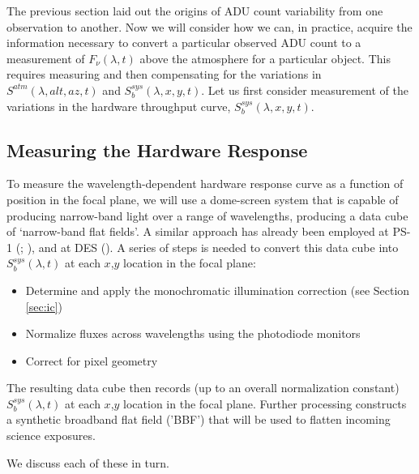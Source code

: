 \documentclass[12pt,preprint]{aastex}
\begin{document}
The previous section laid out the origins of ADU count variability
from one observation to another. Now we will consider how we can, in
practice, acquire the information necessary to convert a particular
observed ADU count to a measurement of $F_\nu(\lambda,t)$ above the
atmosphere for a particular object.  This requires measuring and then 
compensating for the variations in
$S^{atm}(\lambda,alt,az,t)$ and $S_b^{sys}(\lambda,x,y,t)$.
Let us first consider measurement of the variations in the hardware
throughput curve, $S_b^{sys}(\lambda,x,y,t)$. 



\subsection{Measuring the Hardware Response}
To measure the wavelength-dependent hardware response
curve as a function of position in the focal plane, we will use a
dome-screen system that is capable of producing narrow-band light 
over a range of wavelengths, producing a data cube of `narrow-band flat
fields'.  A similar approach has already been employed at PS-1 (\citep{StubbsTonry2012}; \citep{Tonry2012}), 
and at DES (\citep{Marshall2013}).  A series of steps is needed to convert this data cube into
$S_b^{sys}(\lambda,t)$ at each $x$,$y$ location in the focal plane:

\begin{itemize}
\item{Determine and apply the monochromatic illumination correction (see Section \ref{sec:ic})}
\item{Normalize fluxes across wavelengths using the photodiode monitors}
\item{Correct for pixel geometry}
\end{itemize}

The resulting data cube then
records (up to an overall normalization constant) $S_b^{sys}(\lambda,t)$ at each $x$,$y$ location in the focal plane. 
Further processing constructs a synthetic broadband flat field ('BBF') that will be used to flatten incoming science exposures.

We discuss each of these in turn.
\end{document}
